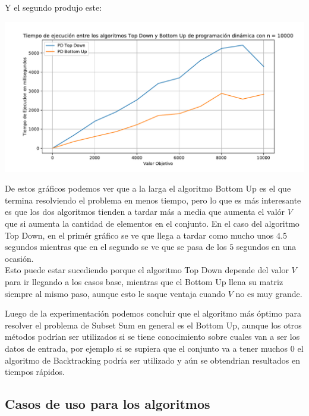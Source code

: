 \documentclass[a4paper]{article}
\begin{document}
Y el segundo produjo este:

\begin{center}
	\includegraphics[width=.8\linewidth]{G4.pdf}
\end{center}

De estos gráficos podemos ver que a la larga el algoritmo Bottom Up es el que termina resolviendo el problema en menos tiempo, pero lo que es más interesante es que los dos algoritmos tienden a tardar más a media que aumenta el valór $V$ que si aumenta la cantidad de elementos en el conjunto. En el caso del algoritmo Top Down, en el primér gráfico se ve que llega a tardar como mucho unos $4.5$ segundos mientras que en el segundo se ve que se pasa de los $5$ segundos en una ocasión.
\\
Esto puede estar sucediendo porque el algoritmo Top Down depende del valor $V$ para ir llegando a los casos base, mientras que el Bottom Up llena su matriz siempre al mismo paso, aunque esto le saque ventaja cuando $V$ no es muy grande.

Luego de la experimentación podemos concluir que el algoritmo más óptimo para resolver el problema de Subset Sum en general es el Bottom Up, aunque los otros métodos podrían ser utilizados si se tiene conocimiento sobre cuales van a ser los datos de entrada, por ejemplo si se supiera que el conjunto va a tener muchos 0 el algoritmo de Backtracking podría ser utilizado y aún se obtendrian resultados en tiempos rápidos.

\subsection{Casos de uso para los algoritmos}




%
\end{document}
